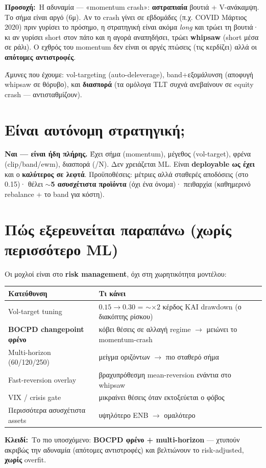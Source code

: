 \documentclass[11pt]{article}
\newcommand{\key}[1]{\par\medskip\noindent\colorbox{soft}{\parbox{\dimexpr\linewidth-2\fboxsep}{\textcolor{accent}{\textbf{Κλειδί:}}\ #1}}\par\medskip}
\newcommand{\warnb}[1]{\par\medskip\noindent\colorbox{soft}{\parbox{\dimexpr\linewidth-2\fboxsep}{\textcolor{warn}{\textbf{Προσοχή:}}\ #1}}\par\medskip}
\begin{document}
\warnb{Η αδυναμία --- «momentum crash»: \textbf{αστραπιαία} βουτιά + V-ανάκαμψη. Το σήμα είναι αργό (6μ).
Αν το crash γίνει σε εβδομάδες (π.χ. COVID Μάρτιος 2020) πριν γυρίσει το πρόσημο, η στρατηγική είναι ακόμα
\emph{long} και τρώει τη βουτιά· κι αν γυρίσει short στον πάτο και η αγορά αναπηδήσει, τρώει \textbf{whipsaw}
(short μέσα σε ράλι). Ο εχθρός του momentum δεν είναι οι αργές πτώσεις (τις κερδίζει) αλλά οι \textbf{απότομες
αντιστροφές}.}
Άμυνες που έχουμε: vol-targeting (auto-deleverage), band+εξομάλυνση (αποφυγή whipsaw σε θόρυβο), και
\textbf{διασπορά} (τα ομόλογα TLT συχνά ανεβαίνουν σε equity crash --- αντισταθμίζουν).

\section{Είναι αυτόνομη στρατηγική;}
\textbf{Ναι --- είναι ήδη πλήρης.} Έχει σήμα (momentum), μέγεθος (vol-target), φρένα (clip/band/ewm),
διασπορά (/N). Δεν χρειάζεται ML. Είναι \textbf{deployable ως έχει} και ο \textbf{καλύτερος σε λεφτά}.
Προϋποθέσεις: μέτριες αλλά σταθερές αποδόσεις (στο 0.15)· θέλει \textbf{$\sim$5 ασυσχέτιστα προϊόντα}
(όχι ένα όνομα)· πειθαρχία (καθημερινό rebalance + το band για κόστη).

\section{Πώς εξερευνείται παραπάνω (χωρίς περισσότερο ML)}
Οι μοχλοί είναι στο \textbf{risk management}, όχι στη χωρητικότητα μοντέλου:
\begin{center}\small
\begin{tabular}{ll}
\toprule
Κατεύθυνση & Τι κάνει \\
\midrule
Vol-target tuning & $0.15\to0.30$ = $\sim\times2$ κέρδος ΚΑΙ drawdown (ο διακόπτης ρίσκου) \\
\textbf{BOCPD changepoint φρένο} & κόβει θέσεις σε αλλαγή regime $\to$ μειώνει το momentum-crash \\
Multi-horizon (60/120/250) & μείγμα οριζόντων $\to$ πιο σταθερό σήμα \\
Fast-reversion overlay & βραχυπρόθεσμη mean-reversion ενάντια στο whipsaw \\
VIX / crisis gate & μικραίνει θέσεις όταν εκτοξεύεται ο φόβος \\
Περισσότερα ασυσχέτιστα assets & υψηλότερο ENB $\to$ ομαλότερο \\
\bottomrule
\end{tabular}
\end{center}
\key{Το πιο υποσχόμενο: \textbf{BOCPD φρένο + multi-horizon} --- χτυπούν ακριβώς την αδυναμία (απότομες
αντιστροφές) και βελτιώνουν το risk-adjusted, \textbf{χωρίς} overfit.}
\end{document}
